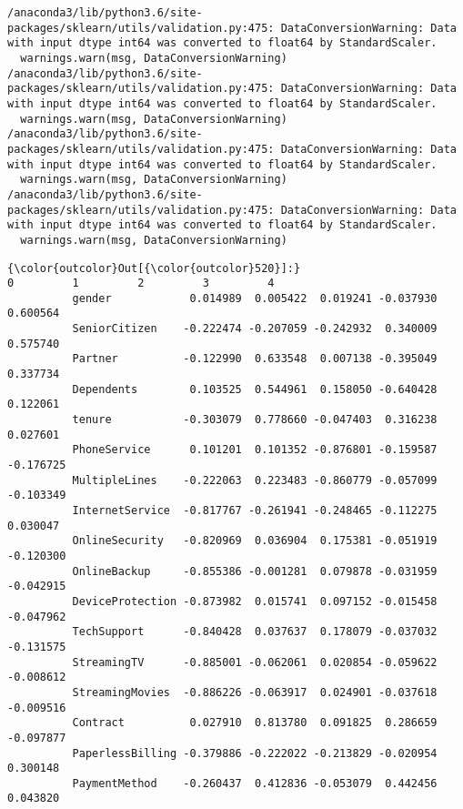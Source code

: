 \documentclass[11pt]{article}
\begin{document}
    \begin{Verbatim}[commandchars=\\\{\}]
/anaconda3/lib/python3.6/site-packages/sklearn/utils/validation.py:475: DataConversionWarning: Data with input dtype int64 was converted to float64 by StandardScaler.
  warnings.warn(msg, DataConversionWarning)
/anaconda3/lib/python3.6/site-packages/sklearn/utils/validation.py:475: DataConversionWarning: Data with input dtype int64 was converted to float64 by StandardScaler.
  warnings.warn(msg, DataConversionWarning)
/anaconda3/lib/python3.6/site-packages/sklearn/utils/validation.py:475: DataConversionWarning: Data with input dtype int64 was converted to float64 by StandardScaler.
  warnings.warn(msg, DataConversionWarning)
/anaconda3/lib/python3.6/site-packages/sklearn/utils/validation.py:475: DataConversionWarning: Data with input dtype int64 was converted to float64 by StandardScaler.
  warnings.warn(msg, DataConversionWarning)

    \end{Verbatim}

\begin{Verbatim}[commandchars=\\\{\}]
{\color{outcolor}Out[{\color{outcolor}520}]:}                          0         1         2         3         4
          gender            0.014989  0.005422  0.019241 -0.037930  0.600564
          SeniorCitizen    -0.222474 -0.207059 -0.242932  0.340009  0.575740
          Partner          -0.122990  0.633548  0.007138 -0.395049  0.337734
          Dependents        0.103525  0.544961  0.158050 -0.640428  0.122061
          tenure           -0.303079  0.778660 -0.047403  0.316238  0.027601
          PhoneService      0.101201  0.101352 -0.876801 -0.159587 -0.176725
          MultipleLines    -0.222063  0.223483 -0.860779 -0.057099 -0.103349
          InternetService  -0.817767 -0.261941 -0.248465 -0.112275  0.030047
          OnlineSecurity   -0.820969  0.036904  0.175381 -0.051919 -0.120300
          OnlineBackup     -0.855386 -0.001281  0.079878 -0.031959 -0.042915
          DeviceProtection -0.873982  0.015741  0.097152 -0.015458 -0.047962
          TechSupport      -0.840428  0.037637  0.178079 -0.037032 -0.131575
          StreamingTV      -0.885001 -0.062061  0.020854 -0.059622 -0.008612
          StreamingMovies  -0.886226 -0.063917  0.024901 -0.037618 -0.009516
          Contract          0.027910  0.813780  0.091825  0.286659 -0.097877
          PaperlessBilling -0.379886 -0.222022 -0.213829 -0.020954  0.300148
          PaymentMethod    -0.260437  0.412836 -0.053079  0.442456  0.043820
\end{Verbatim}
            
\end{document}
